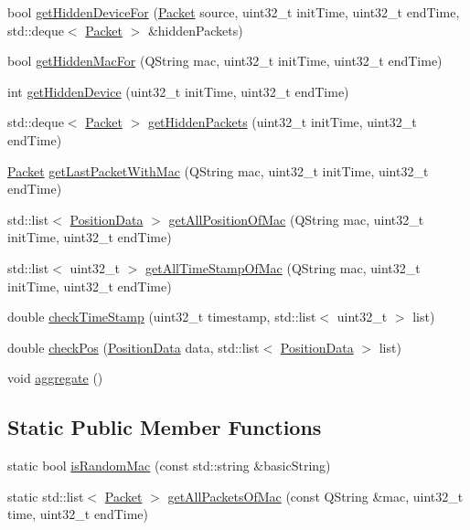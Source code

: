 \begin{DoxyCompactItemize}
\item 
bool \hyperlink{class_monitoring_server_a3bafba709daa02510e3194d91fd86170}{get\+Hidden\+Device\+For} (\hyperlink{class_packet}{Packet} source, uint32\+\_\+t init\+Time, uint32\+\_\+t end\+Time, std\+::deque$<$ \hyperlink{class_packet}{Packet} $>$ \&hidden\+Packets)
\item 
bool \hyperlink{class_monitoring_server_a5dc421b81970cf4523c84e3653dada41}{get\+Hidden\+Mac\+For} (Q\+String mac, uint32\+\_\+t init\+Time, uint32\+\_\+t end\+Time)
\item 
int \hyperlink{class_monitoring_server_ae86353505417c1ee5510dd4fcaee972c}{get\+Hidden\+Device} (uint32\+\_\+t init\+Time, uint32\+\_\+t end\+Time)
\item 
std\+::deque$<$ \hyperlink{class_packet}{Packet} $>$ \hyperlink{class_monitoring_server_abf46ea7e4384479240573963b30eda23}{get\+Hidden\+Packets} (uint32\+\_\+t init\+Time, uint32\+\_\+t end\+Time)
\item 
\hyperlink{class_packet}{Packet} \hyperlink{class_monitoring_server_a56c13fabe5959bd524865d9686a42d43}{get\+Last\+Packet\+With\+Mac} (Q\+String mac, uint32\+\_\+t init\+Time, uint32\+\_\+t end\+Time)
\item 
std\+::list$<$ \hyperlink{class_position_data}{Position\+Data} $>$ \hyperlink{class_monitoring_server_a1e12a2ee3d7ecb73e1316e8818e64374}{get\+All\+Position\+Of\+Mac} (Q\+String mac, uint32\+\_\+t init\+Time, uint32\+\_\+t end\+Time)
\item 
std\+::list$<$ uint32\+\_\+t $>$ \hyperlink{class_monitoring_server_ac505f5aa1e6b6c4f855537e3297b0214}{get\+All\+Time\+Stamp\+Of\+Mac} (Q\+String mac, uint32\+\_\+t init\+Time, uint32\+\_\+t end\+Time)
\item 
double \hyperlink{class_monitoring_server_a645e06f62742717a286f2cfd9bad6fb0}{check\+Time\+Stamp} (uint32\+\_\+t timestamp, std\+::list$<$ uint32\+\_\+t $>$ list)
\item 
double \hyperlink{class_monitoring_server_a1e9a9e70156471a2fdc73d3bdadbd308}{check\+Pos} (\hyperlink{class_position_data}{Position\+Data} data, std\+::list$<$ \hyperlink{class_position_data}{Position\+Data} $>$ list)
\item 
void \hyperlink{class_monitoring_server_addc87726ec0ad24c95905b388ce794e5}{aggregate} ()
\end{DoxyCompactItemize}
\subsection*{Static Public Member Functions}
\begin{DoxyCompactItemize}
\item 
static bool \hyperlink{class_monitoring_server_acb617118322490550d1c996a8337d412}{is\+Random\+Mac} (const std\+::string \&basic\+String)
\item 
static std\+::list$<$ \hyperlink{class_packet}{Packet} $>$ \hyperlink{class_monitoring_server_a5a1e4be78d806bf0960eb35b445b45b2}{get\+All\+Packets\+Of\+Mac} (const Q\+String \&mac, uint32\+\_\+t time, uint32\+\_\+t end\+Time)
\end{DoxyCompactItemize}


